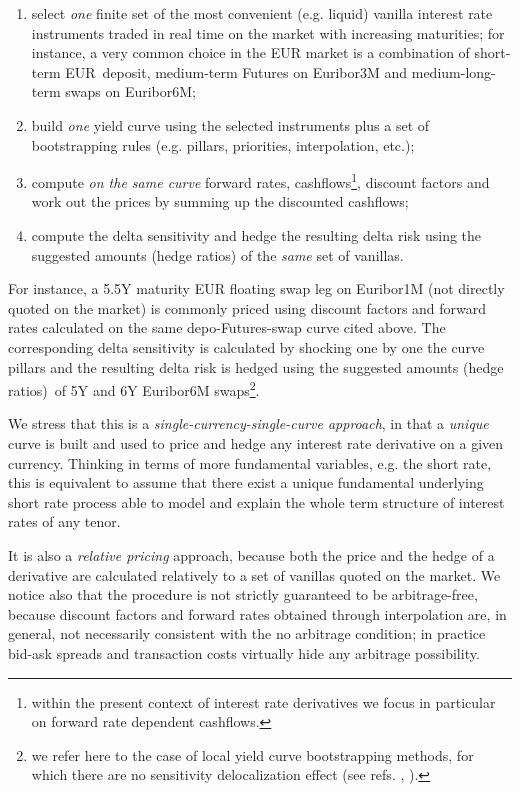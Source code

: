 \documentclass[11pt,reqno]{amsart}
\begin{document}
\begin{enumerate}
\item select \emph{one} finite set of the most convenient (e.g. liquid) vanilla interest rate instruments traded in real time on the market with increasing maturities; for instance, a very common choice in the EUR market is a combination of short-term EUR\ deposit, medium-term Futures on Euribor3M and medium-long-term swaps on Euribor6M;

\item build \emph{one} yield curve using the selected instruments plus a set of bootstrapping rules (e.g. pillars, priorities, interpolation, etc.);

\item compute \emph{on the same curve} forward rates, cashflows\footnote{within the present context of interest rate derivatives we focus in particular on forward rate dependent cashflows.}, discount factors and work out the prices by summing up the discounted cashflows;

\item compute the delta sensitivity and hedge the resulting delta risk using the suggested amounts (hedge ratios) of the \emph{same} set of vanillas.
\end{enumerate}

For instance, a 5.5Y maturity EUR floating swap leg on Euribor1M (not directly quoted on the market) is commonly priced using discount factors and forward rates calculated on the same depo-Futures-swap curve cited above. The corresponding delta sensitivity is calculated by shocking one by one the curve pillars and the resulting delta risk is hedged using the suggested amounts (hedge ratios)\ of 5Y and 6Y Euribor6M swaps\footnote{we refer here to the case of local yield curve bootstrapping methods, for which there are no sensitivity delocalization effect (see refs. \cite{HagWes06}, \cite{And07} \cite{HagWes08}).}.

We stress that this is a \emph{single-currency-single-curve approach}, in that a \emph{unique} curve is built and used to price and hedge any interest rate derivative on a given currency. Thinking in terms of more fundamental variables, e.g. the short rate, this is equivalent to assume that there exist a unique fundamental underlying short rate process able to model and explain the whole term structure of interest rates of any tenor.

It is also a \emph{relative pricing} approach, because both the price and the hedge of a derivative are calculated relatively to a set of vanillas quoted on the market. We notice also that the procedure is not strictly guaranteed to be arbitrage-free, because discount factors and forward rates obtained through interpolation are, in general, not necessarily consistent with the no arbitrage condition; in practice bid-ask spreads and transaction costs virtually hide any arbitrage possibility.
\end{document}
